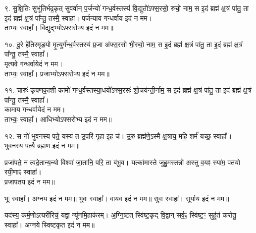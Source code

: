 ९. सु॒क्षि॒तिः सुभू॑तिर्भद्र॒कृत् सुव॑र्वान् प॒र्जन्यो॑ गन्ध॒र्वस्तस्य॑ वि॒द्युतो॑॑ऽफ्स॒रसो॒ रुचो॒ नाम॒ स इ॒दं ब्रह्म॑ क्ष॒त्रं पा॑तु॒ ता इ॒दं ब्रह्म॑ क्ष॒त्रं पा᳚न्तु॒ तस्मै॒ स्वाहा᳚। पर्जन्याय गन्धर्वाय इदं न मम।\\
ताभ्यः॒ स्वाहा᳚। विद्युद्भ्योऽफ्सरोभ्य इदं न मम॥

१०. दू॒रे हे॑तिरमृड॒यो मृ॒त्युर्ग॑न्ध॒र्वस्तस्य॑ प्र॒जा अ॑फ्स॒रसो॑ भी॒रुवो॒ नाम॒ स इ॒दं ब्रह्म॑ क्ष॒त्रं पा॑तु॒ ता इ॒दं ब्रह्म॑ क्ष॒त्रं पा᳚न्तु॒ तस्मै॒ स्वाहा᳚।\\
मृत्यवे गन्धर्वायेदं न मम।\\
ताभ्यः॒ स्वाहा᳚। प्रजाभ्योऽफ्सरोभ्य इदं न मम॥

११. चारुः॑ कृपणका॒शी कामो॑ गन्ध॒र्वस्तस्या॒धयो᳚ऽफ्स॒रसः॑ शो॒चय॑न्ती॒र्नाम॒ स इ॒दं ब्रह्म॑ क्ष॒त्रं पा॑तु॒ ता इ॒दं ब्रह्म॑ क्ष॒त्रं पा᳚न्तु॒ तस्मै॒ स्वाहा᳚।\\
कामाय गन्धर्वायेदं न मम।\\
ताभ्यः॒ स्वाहा᳚। आधिभ्योऽफ्सरोभ्य इदं न मम॥

१२. स नो॑ भुवनस्य पते॒ यस्य॑ त उ॒परि॑ गृ॒हा इ॒ह च॑।
उ॒रु ब्रह्म॑णे॒ऽस्मै क्ष॒त्राय॒ महि॒ शर्म॑ यच्छ॒ स्वाहा᳚॥\\
भुवनस्य पत्यै ब्रह्मण इदं न मम॥

प्रजा॑पते॒ न त्वदे॒तान्य॒न्यो विश्वा॑ जा॒तानि॒ परि॒ ता ब॑भू॒व।
यत्का॑मास्ते जुहु॒मस्तन्नो॑ अस्तु व॒यꣴ स्या॑म॒ पत॑यो रयी॒णाꣴ स्वाहा᳚।\\
प्रजापतय इदं न मम॥

भूः स्वाहा᳚। अग्नय इदं न मम॥
भुवः॒ स्वाहा᳚। वायव इदं न मम॥
सुवः॒ स्वाहा᳚। सूर्याय इदं न मम॥

यद॑स्य॒ कर्म॒णोऽत्यरी॑रिचं॒ यद्वा॒ न्यू॑नमि॒हाक॑रम्। अ॒ग्नि॒ष्टत् स्वि॑ष्ट॒कृद् वि॒द्वान् सर्व॒ꣴ॒ स्वि॑ष्ट॒ꣳ॒ सुहु॑तं करोतु॒ स्वाहा᳚। अग्नये स्विष्टकृत इदं न मम॥